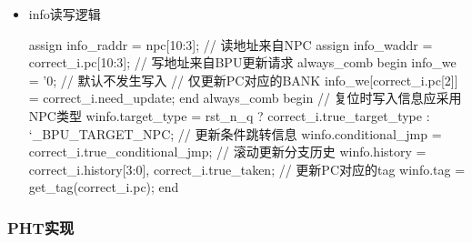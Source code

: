 \begin{itemize}
\begin{CodeBlock}[language=BookSystemVerilog]
assign btb_raddr = npc[11:3];              // 读地址来自NPC
assign btb_waddr = correct_i.pc[11:3];     // 写地址来自BPU更新请求
assign btb_wdata = correct_i.true_target;  // 将正确的跳转目标写入btb ram
always_comb begin
  btb_we = '0;  // 默认不发生写入
  // 仅更新PC对应的BANK
  // 仅CALL和IMM类型指令需要缓存目标地址
  // 因为：NPC类型不跳转，RETURN类型地址来自RAS
  btb_we[correct_i.pc[2]] = correct_i.need_update && 
                           (correct_i.true_target_type == `_BPU_TARGET_CALL ||
                            correct_i.true_target_type == `_BPU_TARGET_IMM);
end
\end{CodeBlock}
\item
  info读写逻辑

\begin{CodeBlock}[language=BookSystemVerilog]
assign info_raddr = npc[10:3];          // 读地址来自NPC
assign info_waddr = correct_i.pc[10:3]; // 写地址来自BPU更新请求
always_comb begin
	info_we = '0;  // 默认不发生写入
  // 仅更新PC对应的BANK
	info_we[correct_i.pc[2]] = correct_i.need_update;
end
always_comb begin
  // 复位时写入信息应采用NPC类型
	winfo.target_type = rst_n_q ? correct_i.true_target_type : `_BPU_TARGET_NPC;
	// 更新条件跳转信息
  winfo.conditional_jmp = correct_i.true_conditional_jmp;
	// 滚动更新分支历史
  winfo.history = {correct_i.history[3:0], correct_i.true_taken};
	// 更新PC对应的tag
  winfo.tag = get_tag(correct_i.pc);
end
\end{CodeBlock}
\end{itemize}

\subsubsection{PHT实现}\label{sec:04-advanced-cpu-007}

